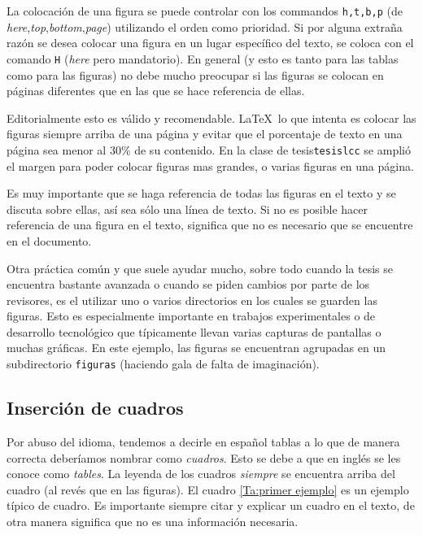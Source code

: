 La colocación de una figura se puede controlar con los commandos
\texttt{h,t,b,p} (de \emph{here},\emph{top},\emph{bottom},\emph{page})
utilizando el orden como prioridad. Si por alguna extraña razón se
desea colocar una figura en un lugar específico del texto, se coloca
con el comando \texttt{H} (\emph{here} pero mandatorio). En general (y
esto es tanto para las tablas como para las figuras) no debe mucho
preocupar si las figuras se colocan en páginas diferentes que en las
que se hace referencia de ellas. 

Editorialmente esto es válido y recomendable. \LaTeX \ lo
que intenta es colocar las figuras siempre arriba de una página y evitar que el
porcentaje de texto en una página sea menor al 30\% de su contenido.
En la clase de tesis\verb+tesislcc+ se amplió el margen para
poder colocar figuras mas grandes, o varias figuras en una página. 

Es muy importante que se haga
referencia de todas las figuras en el texto y se discuta sobre ellas,
así sea sólo una línea de texto. Si no es posible hacer referencia de
una figura en el texto, significa que no es necesario que se encuentre
en el documento.

Otra práctica común y que suele ayudar mucho, sobre todo cuando la
tesis se encuentra bastante avanzada o cuando se piden cambios por
parte de los revisores, es el utilizar uno o varios directorios en los cuales se guarden las
figuras. Esto es especialmente importante en trabajos experimentales o
de desarrollo tecnológico que típicamente llevan varias capturas de
pantallas o muchas gráficas. En este ejemplo, las figuras se
encuentran agrupadas en un subdirectorio \texttt{figuras} (haciendo
gala de falta de imaginación).



\subsection{Inserción de cuadros}



Por abuso del idioma, tendemos a decirle en español tablas a lo que de
manera correcta deberíamos nombrar como \emph{cuadros}. Esto se debe a
que en inglés se les conoce como \emph{tables}. La leyenda de los
cuadros \emph{siempre} se encuentra arriba del cuadro (al revés que en las
figuras). El cuadro \ref{Ta:primer ejemplo} es un ejemplo típico de
cuadro. Es importante siempre citar y explicar un cuadro en el texto,
de otra manera significa que no es una información  necesaria. 



